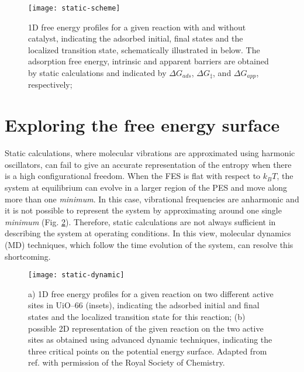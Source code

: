 \begin{figure}[!htbp]
	\centering
 	\texttt{[image: static-scheme]}
	\caption{1D free energy profiles for a given reaction with and without catalyst, indicating the adsorbed initial, final states and the localized transition state, schematically illustrated in below. The adsorption free energy, intrinsic and apparent barriers are obtained by static calculations and indicated by $\Delta G_{ads}$, $\Delta G_{\ddagger}$, and $\Delta G_{app}$, respectively;}
	\label{fig:static-scheme}
\end{figure}

\section{Exploring the free energy surface}
Static calculations, where molecular vibrations are approximated using harmonic oscillators, can fail to give an accurate representation of the entropy when there is a high configurational freedom. When the FES is flat with respect to $k_B T$, the system at equilibrium can evolve in a larger region of the PES and move along more than one \textit{minimum}. In this case, vibrational frequencies are anharmonic and it is not possible to represent the system by approximating around one single \textit{minimum} (Fig. \ref{fig:static-dynamic}). Therefore, static calculations are not always sufficient in describing the system at operating conditions. In this view, molecular dynamics (MD) techniques, which follow the time evolution of the system, can resolve this shortcoming.
\begin{figure}[!htbp]
	\centering
 	\texttt{[image: static-dynamic]}
	\caption{a) 1D free energy profiles for a given reaction on two different active sites in UiO--66 (insets), indicating the adsorbed initial and final states and the localized transition state for this reaction; (b) possible 2D representation of the given reaction on the two active sites as obtained using advanced dynamic techniques, indicating the three critical points on the potential energy surface. Adapted from ref. \cite{rogge2017metal} with permission of the Royal Society of Chemistry.}
	\label{fig:static-dynamic}
\end{figure}

